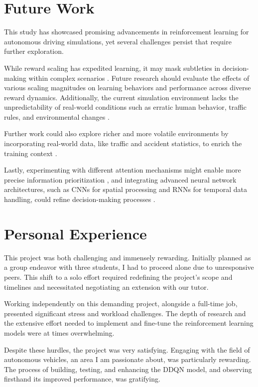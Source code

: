 \documentclass{article}
\begin{document}
\section{Future Work}

This study has showcased promising advancements in reinforcement learning for autonomous driving simulations, yet several challenges persist that require further exploration.

While reward scaling has expedited learning, it may mask subtleties in decision-making within complex scenarios \citep{silver2016mastering}. Future research should evaluate the effects of various scaling magnitudes on learning behaviors and performance across diverse reward dynamics. Additionally, the current simulation environment lacks the unpredictability of real-world conditions such as erratic human behavior, traffic rules, and environmental changes \citep{dosovitskiy2017carla}.

Further work could also explore richer and more volatile environments by incorporating real-world data, like traffic and accident statistics, to enrich the training context \citep{bojarski2016end}. 

Lastly, experimenting with different attention mechanisms might enable more precise information prioritization \citep{DBLP:journals/corr/VaswaniSPUJGKP17}, and integrating advanced neural network architectures, such as CNNs for spatial processing and RNNs for temporal data handling, could refine decision-making processes \citep{lecun2015deep}.

\section{Personal Experience}

This project was both challenging and immensely rewarding. Initially planned as a group endeavor with three students, I had to proceed alone due to unresponsive peers. This shift to a solo effort required redefining the project's scope and timelines and necessitated negotiating an extension with our tutor.

Working independently on this demanding project, alongside a full-time job, presented significant stress and workload challenges. The depth of research and the extensive effort needed to implement and fine-tune the reinforcement learning models were at times overwhelming.

Despite these hurdles, the project was very satisfying. Engaging with the field of autonomous vehicles, an area I am passionate about, was particularly rewarding. The process of building, testing, and enhancing the DDQN model, and observing firsthand its improved performance, was gratifying.
\end{document}
